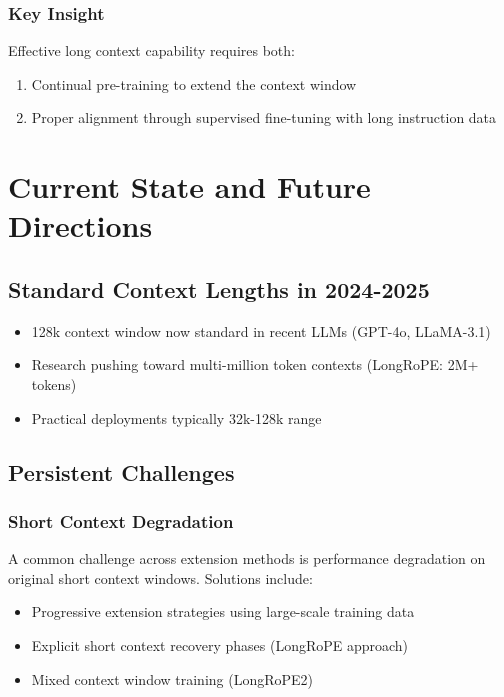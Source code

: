 \documentclass[11pt,letterpaper]{article}
\begin{document}
\subsubsection{Key Insight}
Effective long context capability requires both:
\begin{enumerate}[leftmargin=*]
    \item Continual pre-training to extend the context window
    \item Proper alignment through supervised fine-tuning with long instruction data
\end{enumerate}

\section{Current State and Future Directions}

\subsection{Standard Context Lengths in 2024-2025}
\begin{itemize}[leftmargin=*]
    \item 128k context window now standard in recent LLMs (GPT-4o, LLaMA-3.1)
    \item Research pushing toward multi-million token contexts (LongRoPE: 2M+ tokens)
    \item Practical deployments typically 32k-128k range
\end{itemize}

\subsection{Persistent Challenges}

\subsubsection{Short Context Degradation}
A common challenge across extension methods is performance degradation on original short context windows. Solutions include:
\begin{itemize}[leftmargin=*]
    \item Progressive extension strategies using large-scale training data
    \item Explicit short context recovery phases (LongRoPE approach)
    \item Mixed context window training (LongRoPE2)
\end{itemize}
\end{document}
